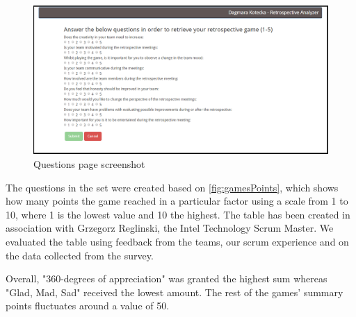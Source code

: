\begin{figure}[h]
\caption{Questions page screenshot}
\label{fig:questionsPage}
\centering
\includegraphics[width=1\textwidth]{screenshots/questions.png}
\end{figure}

The questions in the set were created based on \autoref{fig:gamesPoints}, which shows how many points the game reached in a particular factor using a scale from 1 to 10, where 1 is the lowest value and 10 the highest. The table has been created in association with Grzegorz Reglinski, the Intel Technology Scrum Master. We evaluated the table using feedback from the teams, our scrum experience and on the data collected from the survey.

Overall, "360-degrees of appreciation" was granted the highest sum whereas "Glad, Mad, Sad" received the lowest amount. The rest of the games' summary points fluctuates around a value of 50.

